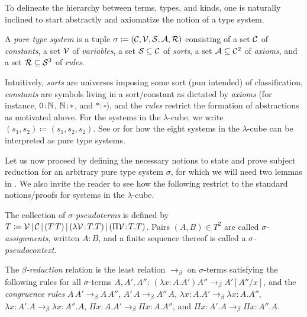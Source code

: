 \documentclass[reqno, twoside]{article}
\begin{document}
    To delineate the hierarchy between terms, types, and kinds, one is naturally inclined to start abstractly and axiomatize the notion of a type system.

    \begin{definition}
        A \textit{pure type system} is a tuple $\sigma\coloneqq(\mathcal{C},\mathcal{V},\mathcal{S},\mathcal{A},\mathcal{R})$ consisting of a set $\mathcal{C}$ of \textit{constants}, a set $\mathcal{V}$ of \textit{variables}, a set $\mathcal{S}\subseteq\mathcal{C}$ of \textit{sorts}, a set $\mathcal{A}\subseteq\mathcal{C}^2$ of \textit{axioms}, and a set $\mathcal{R}\subseteq\mathcal{S}^3$ of \textit{rules}.
    \end{definition}

    Intuitively, \textit{sorts} are universes imposing some sort (pun intended) of classification, \textit{constants} are symbols living in a sort/constant as dictated by \textit{axioms} (for instance, $0\!:\!\mathbb{N}$, $\mathbb{N}\!:\!\ast$, and $\ast\!:\!\square$), and the \textit{rules} restrict the formation of abstractions as motivated above. For the systems in the $\lambda$-cube, we write $(s_1,s_2)\coloneqq(s_1,s_2,s_2)$. See \cite{Bar91} or \cite{Bar92} for how the eight systems in the $\lambda$-cube can be interpreted as pure type systems.

    Let us now proceed by defining the necessary notions to state and prove subject reduction for an arbitrary pure type system $\sigma$, for which we will need two lemmas in \cite{GN91}. We also invite the reader to see how the following restrict to the standard notions/proofs for systems in the $\lambda$-cube.

    \begin{definition}
        The collection of \textit{$\sigma$-pseudoterms} is defined by $T\coloneqq\mathcal{V}\,|\,\mathcal{C}\,|\,(T\,T)\,|\,(\lambda\mathcal{V}\!:\!T.T)\,|\,(\Pi\mathcal{V}\!:\!T.T)$. Pairs $(A,B)\in T^2$ are called \textit{$\sigma$-assignments}, written $A\!:\!B$, and a finite sequence thereof is called a \textit{$\sigma$-pseudocontext}.
    \end{definition}

    \begin{definition}
        The \textit{$\beta$-reduction} relation is the least relation $\rightarrow_\beta$ on $\sigma$-terms satisfying the following rules for all $\sigma$-terms $A,A',A''$: $(\lambda x\!:\!A.A')A''\rightarrow_\beta A'[A''/x]$, and the \textit{congruence rules} $A\,A'\rightarrow_\beta A\,A''$, $A'\,A\rightarrow_\beta A''\,A$, $\lambda x\!:\!A.A'\rightarrow_\beta\lambda x\!:\!A.A''$, $\lambda x\!:\!A'.A\rightarrow_\beta\lambda x\!:\!A''.A$, $\Pi x\!:\!A.A'\rightarrow_\beta\Pi x\!:\!A.A''$, and $\Pi x\!:\!A'.A\rightarrow_\beta\Pi x\!:\!A''.A$.
    \end{definition}
\end{document}
